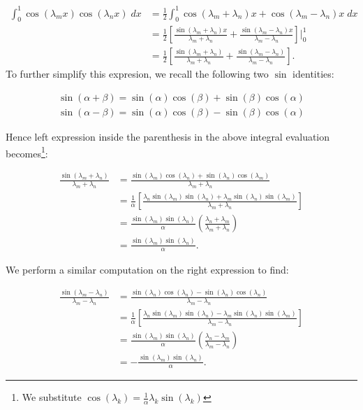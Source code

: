 \begin{solution}
    \begin{align*}
        \int_{0}^{1}{\cos{(\lambda_m x)}\cos{(\lambda_n x)}\; dx} &= \frac{1}{2} \int_{0}^{1}{\cos{(\lambda_m + \lambda_n) x} + \cos{(\lambda_m - \lambda_n) x}\; dx} \\
                                                                  &= \frac{1}{2} \left[ \frac{\sin{(\lambda_m + \lambda_n)x}}{\lambda_m + \lambda_n} + \frac{\sin{(\lambda_m - \lambda_n)x}}{\lambda_m - \lambda_n} \right] \bigg\vert_{0}^{1} \\
                                                                  &= \frac{1}{2} \left[ \frac{\sin{(\lambda_m + \lambda_n)}}{\lambda_m + \lambda_n} + \frac{\sin{(\lambda_m - \lambda_n)}}{\lambda_m - \lambda_n} \right].
    \end{align*}
    To further simplify this expresion, we recall the following two $\sin$ identities:

    \begin{align*}
        \sin{(\alpha + \beta)} = \sin{(\alpha)}\cos{(\beta)} + \sin{(\beta)}\cos{(\alpha)} \\
        \sin{(\alpha - \beta)} = \sin{(\alpha)}\cos{(\beta)} - \sin{(\beta)}\cos{(\alpha)}
    \end{align*}

    Hence left expression inside the parenthesis in the above integral evaluation becomes\footnote[\dagger]{
        We substitute $\cos{(\lambda_k)} = \frac{1}{\alpha} \lambda_k \sin{(\lambda_k)}$
    }:

    \begin{align*}
        \frac{\sin{(\lambda_m + \lambda_n)}}{\lambda_m + \lambda_n}
        &= \frac{\sin{(\lambda_m)} \cos{(\lambda_n) + \sin{(\lambda_n)}} \cos{(\lambda_m)}}{\lambda_m + \lambda_n} \\
        &= \frac{1}{\alpha} \left[ \frac{\lambda_n \sin{(\lambda_m)} \sin{(\lambda_n) + \lambda_m} \sin{(\lambda_n)} \sin{(\lambda_m)}}{\lambda_m + \lambda_n} \right] \\
        &= \frac{\sin{(\lambda_m)} \sin{(\lambda_n)}}{\alpha} \left( \frac{\lambda_n + \lambda_m}{\lambda_m + \lambda_n} \right) \\
        &= \frac{\sin{(\lambda_m)} \sin{(\lambda_n)}}{\alpha}.
    \end{align*}
    
    We perform a similar computation on the right expression to find:

    \begin{align*}
        \frac{\sin{(\lambda_m - \lambda_n)}}{\lambda_m - \lambda_n}
        &= \frac{\sin{(\lambda_n)} \cos{(\lambda_n) - \sin{(\lambda_n)}} \cos{(\lambda_n)}}{\lambda_m - \lambda_n} \\
        &= \frac{1}{\alpha} \left[ \frac{\lambda_n \sin{(\lambda_m)} \sin{(\lambda_n) - \lambda_m} \sin{(\lambda_n)} \sin{(\lambda_m)}}{\lambda_m - \lambda_n} \right] \\
        &= \frac{\sin{(\lambda_m)} \sin{(\lambda_n)}}{\alpha} \left( \frac{\lambda_n - \lambda_m}{\lambda_m - \lambda_n} \right) \\
        &= -\frac{\sin{(\lambda_m)} \sin{(\lambda_n)}}{\alpha}.
    \end{align*}



\end{solution}
